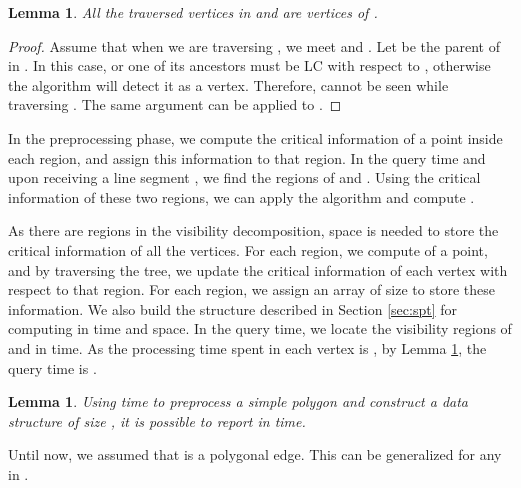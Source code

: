 \documentclass[5p]{elsarticle}
\newtheorem{lemma}[theorem]{Lemma}
\begin{document}
\begin{lemma} \label{lemma3}
All the traversed vertices in  and  are vertices of .
\end{lemma}
\begin{proof}
Assume that when we are traversing , we meet  and .
Let  be the parent of  in . In this case,  or one of its ancestors 
must be LC with respect to , otherwise the algorithm will detect it as a  vertex. 
Therefore,  cannot be seen while traversing . The same argument can be applied to .
\end{proof}


In the preprocessing phase, we compute the critical
information of a point inside each region, and assign this
information to that region.
In the query time and upon receiving a line segment , 
we find the regions of  and .
Using the critical information of these two regions, 
we can apply the algorithm and compute .

As there are  regions in the visibility decomposition, 
 space is needed to store the critical information of all the vertices. 
For each region, we compute  of a point, 
and by traversing the tree, we update the critical
information of each vertex with respect to that region.  
For each region, we assign an array of size  to store these information.
We also build the structure described 
in Section \ref{sec:spt} for computing  in time  and  space.
In the query time, we locate the visibility regions of  and  in  time. 
As the processing time spent in each vertex is , by Lemma \ref{lemma3}, 
the query time is .

\begin{lemma} \label{lem:primaryresult}
Using  time to preprocess a simple polygon  and construct a 
data structure of size , it is possible to report  in  time.
\end{lemma}


Until now, we assumed that  is a polygonal edge.
This can be generalized for any  in . 
\end{document}
